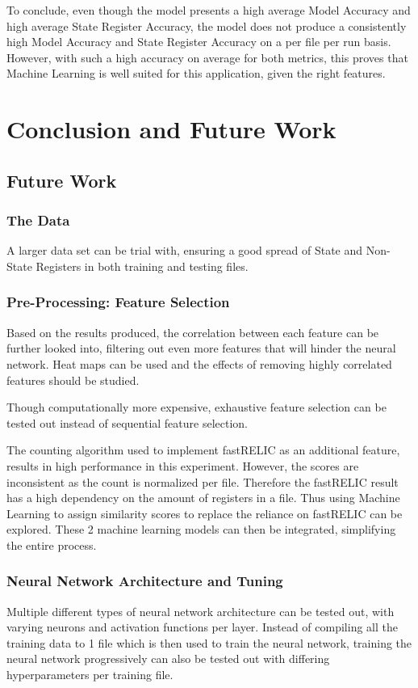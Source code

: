 \documentclass{tum-book}
\begin{document}
    \bigskip\noindent
    To conclude, even though the model presents a high average Model Accuracy and high average State Register Accuracy, the model does not produce a consistently high Model Accuracy and State Register Accuracy on a per file per run basis. However, with such a high accuracy on average for both metrics, this proves that Machine Learning is well suited for this application, given the  right features.
    

\chapter{Conclusion and Future Work}
    \section{Future Work}\label{section:Future Work}
    \subsection{The Data}
    A larger data set can be trial with, ensuring a good spread of State and Non-State Registers in both training and testing files.

    \subsection{Pre-Processing: Feature Selection}
    Based on the results produced, the correlation between each feature can be further looked into, filtering out even more features that will hinder the neural network. Heat maps can be used and the effects of removing highly correlated features should be studied. 
    
    \bigskip\noindent
    Though computationally more expensive, exhaustive feature selection can be tested out instead of sequential feature selection.
    
    \bigskip\noindent
    The counting algorithm used to implement fastRELIC as an additional feature, results in high performance in this experiment. However, the scores are inconsistent as the count is normalized per file. Therefore the fastRELIC result has a high dependency on the amount of registers in a file. Thus using Machine Learning to assign similarity scores to replace the reliance on fastRELIC can be explored. These 2 machine learning models can then be integrated, simplifying the entire process. 
    
    
    \subsection{Neural Network Architecture and Tuning}
    Multiple different types of neural network architecture can be tested out, with varying neurons and activation functions per layer. Instead of compiling all the training data to 1 file which is then used to train the neural network, training the neural network progressively can also be tested out with differing hyperparameters per training file. 
    
\end{document}
